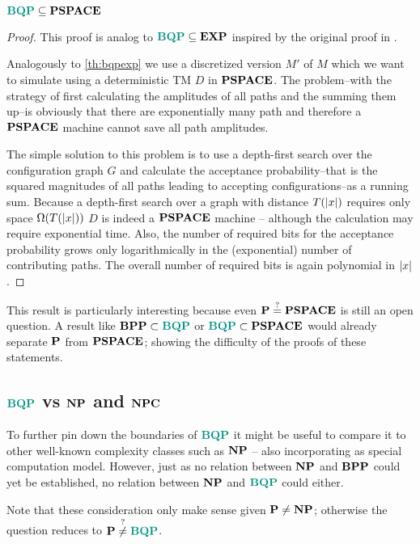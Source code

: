 \begin{theorem}
\label{th:bqppspace}
$\BQP\subseteq\PSPACE$

\begin{proof}
This proof is analog to $\BQP\subseteq\EXP$ inspired by the original proof in \cite{bernstein_vazirani_1997}.

Analogously to \cref{th:bqpexp} we use a discretized version $M'$ of $M$ which we want to simulate using a deterministic \ac{TM} $D$ in $\PSPACE$.
The problem--with the strategy of first calculating the amplitudes of all paths and the summing them up--is obviously that there are exponentially many path and therefore a $\PSPACE$ machine cannot save all path amplitudes.

The simple solution to this problem is to use a depth-first search over the configuration graph $G$ and calculate the acceptance probability--that is the squared magnitudes of all paths leading to accepting configurations--as a running sum.
Because a depth-first search over a graph with distance $T(\abs{x})$ requires only space $\Omega(T(\abs{x}))$ $D$ is indeed a $\PSPACE$ machine -- although the calculation may require exponential time.
Also, the number of required bits for the acceptance probability grows only logarithmically in the (exponential) number of contributing paths.
The overall number of required bits is again polynomial in $\abs{x}$.
\end{proof}
\end{theorem}
This result is particularly interesting because even $\P\overset{?}{=}\PSPACE$ is still an open question.
A result like $\BPP\subset\BQP$ or $\BQP\subset\PSPACE$ would already separate $\P$ from $\PSPACE$; showing the difficulty of the proofs of these statements.

\subsection{$\BQP$ vs $\NP$ and $\NPC$}
To further pin down the boundaries of $\BQP$ it might be useful to compare it to other well-known complexity classes such as $\NP$ -- also incorporating as special computation model.
However, just as no relation between $\NP$ and $\BPP$ could yet be established, no relation between $\NP$ and $\BQP$ could either.

Note that these consideration only make sense given $\P\neq\NP$; otherwise the question reduces to $\P\overset{?}{\neq}\BQP$.

